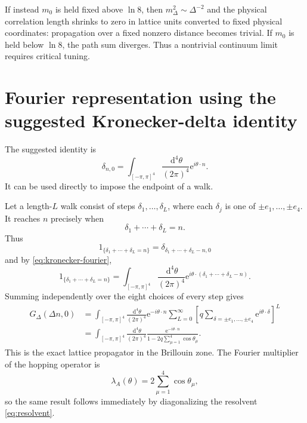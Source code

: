 \documentclass[11pt]{article}
\newcommand{\e}{\mathrm e}
\newcommand{\dd}{\,\mathrm d}
\begin{document}
	If instead $m_0$ is held fixed above $\ln8$, then $m_\Delta^2\sim\Delta^{-2}$ and the physical correlation length shrinks to zero in lattice units converted to fixed physical coordinates: propagation over a fixed nonzero distance becomes trivial. If $m_0$ is held below $\ln8$, the path sum diverges. Thus a nontrivial continuum limit requires critical tuning.
	
	\section{Fourier representation using the suggested Kronecker-delta identity}
	The suggested identity is
	\begin{equation}
		\label{eq:kronecker-fourier}
		\delta_{n,0}
		=\int_{[-\pi,\pi]^4}\frac{\dd^4\theta}{(2\pi)^4}
		\e^{i\theta\cdot n}.
	\end{equation}
	It can be used directly to impose the endpoint of a walk.
	
	Let a length-$L$ walk consist of steps $\delta_1,\dots,\delta_L$, where each $\delta_j$ is one of $\pm e_1,\dots,\pm e_4$. It reaches $n$ precisely when
	\[
	\delta_1+\cdots+\delta_L=n.
	\]
	Thus
	\[
	1_{\{\delta_1+\cdots+\delta_L=n\}}
	=\delta_{\delta_1+\cdots+\delta_L-n,0}
	\]
	and by \eqref{eq:kronecker-fourier},
	\[
	1_{\{\delta_1+\cdots+\delta_L=n\}}
	=\int_{[-\pi,\pi]^4}\frac{\dd^4\theta}{(2\pi)^4}
	\e^{i\theta\cdot(\delta_1+\cdots+\delta_L-n)}.
	\]
	Summing independently over the eight choices of every step gives
	\begin{align}
		G_\Delta(\Delta n,0)
		&=\int_{[-\pi,\pi]^4}\frac{\dd^4\theta}{(2\pi)^4}
		\e^{-i\theta\cdot n}
		\sum_{L=0}^\infty
		\left[q\sum_{\delta=\pm e_1,\dots,\pm e_4}
		\e^{i\theta\cdot\delta}\right]^L \\
		&=\int_{[-\pi,\pi]^4}\frac{\dd^4\theta}{(2\pi)^4}
		\frac{\e^{-i\theta\cdot n}}
		{1-2q\sum_{\mu=1}^4\cos\theta_\mu}.
		\label{eq:fourier-G}
	\end{align}
	This is the exact lattice propagator in the Brillouin zone. The Fourier multiplier of the hopping operator is
	\[
	\lambda_A(\theta)=2\sum_{\mu=1}^4\cos\theta_\mu,
	\]
	so the same result follows immediately by diagonalizing the resolvent \eqref{eq:resolvent}.
	
\end{document}
